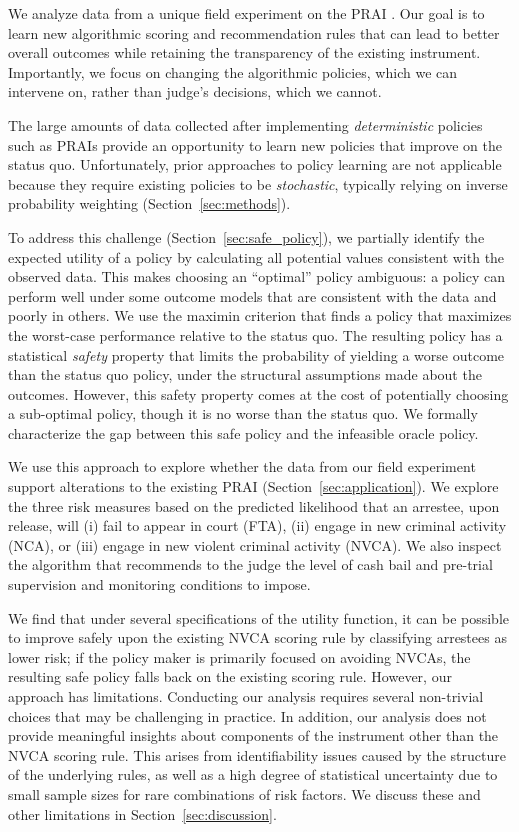 \documentclass[12pt]{article}
\theoremstyle{definition}
\newcommand{\<}{\langle}
\renewcommand{\>}{\rangle}
\begin{document}
We analyze data from a unique field experiment on the PRAI
\citep{greiner2020_rct,Imai2020}.  Our goal is to learn new
algorithmic scoring and recommendation rules that can lead to better
overall outcomes while retaining the transparency of the existing
instrument.  Importantly, we focus on changing the algorithmic
policies, which we can intervene on, rather than judge's decisions,
which we cannot.

The large amounts of data collected after implementing {\it
  deterministic} policies such as PRAIs provide an opportunity to
learn new policies that improve on the status quo.  Unfortunately,
prior approaches to policy learning are not applicable because they
require existing policies to be {\it stochastic}, typically relying on
inverse probability weighting
(Section~\ref{sec:methods}).

To address this challenge (Section~\ref{sec:safe_policy}), we
partially identify the expected utility of a policy by calculating all
potential values consistent with the observed data.  This makes
choosing an ``optimal'' policy ambiguous: a policy can perform well
under some outcome models that are consistent with the data and poorly
in others.  We use the maximin criterion that finds a policy that
maximizes the worst-case performance relative to the status quo.  The
resulting policy has a statistical {\it safety} property that limits
the probability of yielding a worse outcome than the status quo
policy, under the structural assumptions made about the outcomes.
However, this safety property comes at the cost of
potentially choosing a sub-optimal policy, though it is no worse than
the status quo.  We formally characterize the gap between this safe
policy and the infeasible oracle policy.

We use this approach to explore whether the data from our field
experiment support alterations to the existing PRAI
(Section~\ref{sec:application}).  We explore the three risk
measures based on the predicted likelihood that an arrestee, upon
release, will (i) fail to appear in court (FTA), (ii) engage in new
criminal activity (NCA), or (iii) engage in new violent criminal
activity (NVCA).  We also inspect the algorithm that recommends to the
judge the level of cash bail and pre-trial supervision and monitoring
conditions to impose.

We find that under several specifications of the utility function, it
can be possible to improve safely upon the existing NVCA scoring rule by
classifying arrestees as lower risk; if the policy maker is
primarily focused on avoiding NVCAs, the resulting safe policy falls
back on the existing scoring rule. 
However, our approach has limitations. Conducting our analysis
requires several non-trivial choices that may be challenging in
practice.  In addition, our analysis does not provide meaningful
insights about components of the instrument other than the NVCA
scoring rule. This arises from identifiability issues caused by
the structure of the underlying rules, as well as a high degree of
statistical uncertainty due to small sample sizes for rare
combinations of risk factors.  We discuss these and other
limitations in Section~\ref{sec:discussion}.
\end{document}
